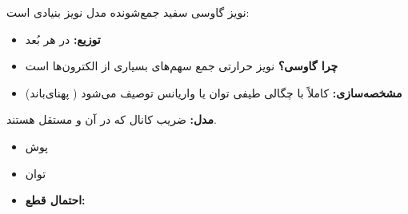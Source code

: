 
نویز گاوسی سفید جمع‌شونده  مدل نویز بنیادی است:

\begin{itemize}
\tightlist
\item
  \textbf{توزیع:}  در هر بُعد
\item
  \textbf{چرا گاوسی؟}  نویز حرارتی جمع سهم‌های بسیاری از الکترون‌ها است
\item
  \textbf{مشخصه‌سازی:} کاملاً با چگالی طیفی توان  یا واریانس  توصیف می‌شود ( پهنای‌باند)
\end{itemize}


\textbf{مدل:} ضریب کانال  که در آن  و مستقل هستند.

\begin{itemize}
\tightlist
\item
  پوش 
\item
  توان 
\item
  \textbf{احتمال قطع:} 
\end{itemize}


